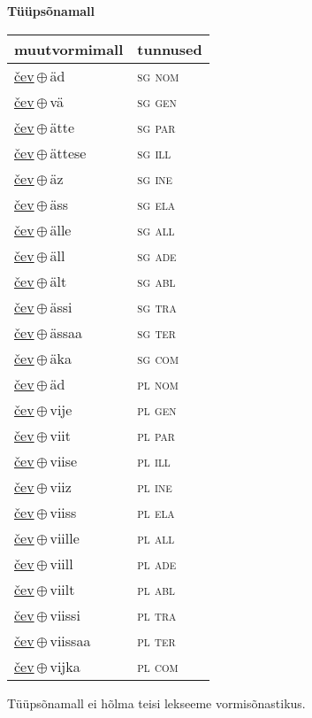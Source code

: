 

\vspace{3.5em}
\noindent \begin{minipage}{\textwidth}
\noindent \textbf{Tüüpsõnamall \,}\\

\begin{sideways}
\begin{tabular}{l l}
muutvormimall & tunnused \\
\hline
\underline{čev}\,$\oplus$\,äd & \textsc{ sg nom } \\
\underline{čev}\,$\oplus$\,vä & \textsc{ sg gen } \\
\underline{čev}\,$\oplus$\,ätte & \textsc{ sg par } \\
\underline{čev}\,$\oplus$\,ättese & \textsc{ sg ill } \\
\underline{čev}\,$\oplus$\,äz & \textsc{ sg ine } \\
\underline{čev}\,$\oplus$\,äss & \textsc{ sg ela } \\
\underline{čev}\,$\oplus$\,älle & \textsc{ sg all } \\
\underline{čev}\,$\oplus$\,äll & \textsc{ sg ade } \\
\underline{čev}\,$\oplus$\,ält & \textsc{ sg abl } \\
\underline{čev}\,$\oplus$\,ässi & \textsc{ sg tra } \\
\underline{čev}\,$\oplus$\,ässaa & \textsc{ sg ter } \\
\underline{čev}\,$\oplus$\,äka & \textsc{ sg com } \\
\underline{čev}\,$\oplus$\,äd & \textsc{ pl nom } \\
\underline{čev}\,$\oplus$\,vije & \textsc{ pl gen } \\
\underline{čev}\,$\oplus$\,viit & \textsc{ pl par } \\
\underline{čev}\,$\oplus$\,viise & \textsc{ pl ill } \\
\underline{čev}\,$\oplus$\,viiz & \textsc{ pl ine } \\
\underline{čev}\,$\oplus$\,viiss & \textsc{ pl ela } \\
\underline{čev}\,$\oplus$\,viille & \textsc{ pl all } \\
\underline{čev}\,$\oplus$\,viill & \textsc{ pl ade } \\
\underline{čev}\,$\oplus$\,viilt & \textsc{ pl abl } \\
\underline{čev}\,$\oplus$\,viissi & \textsc{ pl tra } \\
\underline{čev}\,$\oplus$\,viissaa & \textsc{ pl ter } \\
\underline{čev}\,$\oplus$\,vijka & \textsc{ pl com } \\
\end{tabular}
\end{sideways}
\label{tab:tüüpsõnamall-čeväd}

\end{minipage}

 
\vspace{1em}
\noindent Tüüpsõnamall  ei hõlma teisi lekseeme vormi\-sõnastikus.
